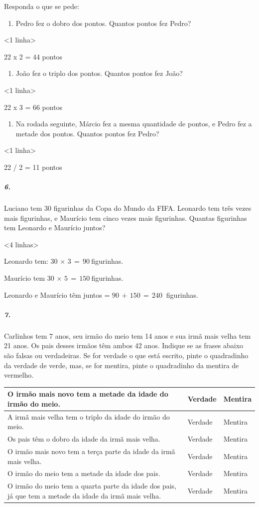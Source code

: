 Responda o que se pede:

\begin{enumerate}
\def\labelenumi{\Alph{enumi})}
\item
  Pedro fez o dobro dos pontos. Quantos pontos fez Pedro?
\end{enumerate}

\textless{}1 linha\textgreater{}

22 x 2 = 44 pontos

\begin{enumerate}
\def\labelenumi{\Alph{enumi})}
\item
  João fez o triplo dos pontos. Quantos pontos fez João?
\end{enumerate}

\textless{}1 linha\textgreater{}

22 x 3 = 66 pontos

\begin{enumerate}
\def\labelenumi{\Alph{enumi})}
\item
  Na rodada seguinte, Márcio fez a mesma quantidade de pontos, e Pedro
  fez a metade dos pontos. Quantos pontos fez Pedro?
\end{enumerate}

\textless{}1 linha\textgreater{}

22 / 2 = 11 pontos

\subparagraph{6.}\label{section-94}

Luciano tem 30 figurinhas da Copa do Mundo da FIFA. Leonardo tem três
vezes mais figurinhas, e Maurício tem cinco vezes mais figurinhas.
Quantas figurinhas tem Leonardo e Maurício juntos?

\textless{}4 linhas\textgreater{}

Leonardo tem: \(30\, \times \, 3\, = \, 90\ \)figurinhas.

Maurício tem \(30\, \times \, 5\, = \, 150\ \)figurinhas.

Leonardo e Maurício têm juntos = \(90\, + \, 150\, = \, 240\ \)
figurinhas.

\subparagraph{7.}\label{section-95}

Carlinhos tem 7 anos, seu irmão do meio tem 14 anos e sua irmã mais
velha tem 21 anos. Os pais desses irmãos têm ambos 42 anos. Indique se
as frases abaixo são falsas ou verdadeiras. Se for verdade o que está
escrito, pinte o quadradinho da verdade de verde, mas, se for mentira,
pinte o quadradinho da mentira de vermelho.

\begin{longtable}[]{@{}lll@{}}
\toprule
O irmão mais novo tem a metade da idade do irmão do meio. & Verdade &
Mentira\tabularnewline
\midrule
\endhead
A irmã mais velha tem o triplo da idade do irmão do meio. & Verdade &
Mentira\tabularnewline
Os pais têm o dobro da idade da irmã mais velha. & Verdade &
Mentira\tabularnewline
O irmão mais novo tem a terça parte da idade da irmã mais velha. &
Verdade & Mentira\tabularnewline
O irmão do meio tem a metade da idade dos pais. & Verdade &
Mentira\tabularnewline
O irmão do meio tem a quarta parte da idade dos pais, já que tem a
metade da idade da irmã mais velha. & Verdade & Mentira\tabularnewline
\bottomrule
\end{longtable}

